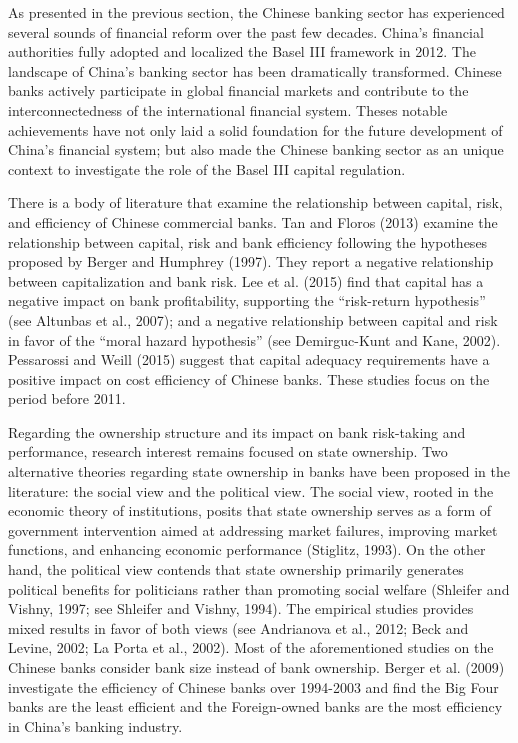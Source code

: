 \documentclass[
  letterpaper,
  DIV=11,
  numbers=noendperiod]{scrreprt}
\begin{document}
As presented in the previous section, the Chinese banking sector has
experienced several sounds of financial reform over the past few
decades. China's financial authorities fully adopted and localized the
Basel III framework in 2012. The landscape of China's banking sector has
been dramatically transformed. Chinese banks actively participate in
global financial markets and contribute to the interconnectedness of the
international financial system. Theses notable achievements have not
only laid a solid foundation for the future development of China's
financial system; but also made the Chinese banking sector as an unique
context to investigate the role of the Basel III capital regulation.

There is a body of literature that examine the relationship between
capital, risk, and efficiency of Chinese commercial banks. Tan and
Floros (2013) examine the relationship between capital, risk and bank
efficiency following the hypotheses proposed by Berger and Humphrey
(1997). They report a negative relationship between capitalization and
bank risk. Lee et al. (2015) find that capital has a negative impact on
bank profitability, supporting the ``risk-return hypothesis'' (see
Altunbas et al., 2007); and a negative relationship between capital and
risk in favor of the ``moral hazard hypothesis'' (see Demirguc-Kunt and
Kane, 2002). Pessarossi and Weill (2015) suggest that capital adequacy
requirements have a positive impact on cost efficiency of Chinese banks.
These studies focus on the period before 2011.

Regarding the ownership structure and its impact on bank risk-taking and
performance, research interest remains focused on state ownership. Two
alternative theories regarding state ownership in banks have been
proposed in the literature: the social view and the political view. The
social view, rooted in the economic theory of institutions, posits that
state ownership serves as a form of government intervention aimed at
addressing market failures, improving market functions, and enhancing
economic performance (Stiglitz, 1993). On the other hand, the political
view contends that state ownership primarily generates political
benefits for politicians rather than promoting social welfare (Shleifer
and Vishny, 1997; see Shleifer and Vishny, 1994). The empirical studies
provides mixed results in favor of both views (see Andrianova et al.,
2012; Beck and Levine, 2002; La Porta et al., 2002). Most of the
aforementioned studies on the Chinese banks consider bank size instead
of bank ownership. Berger et al. (2009) investigate the efficiency of
Chinese banks over 1994-2003 and find the Big Four banks are the least
efficient and the Foreign-owned banks are the most efficiency in China's
banking industry.
\end{document}

